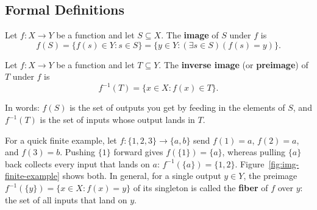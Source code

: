 \subsection{Formal Definitions}

\begin{definition}
Let $f: X \to Y$ be a function and let $S \subseteq X$. The \textbf{image} of $S$ under $f$ is
\[
f(S) = \{f(s) \in Y : s \in S\} = \{y \in Y : (\exists s \in S)(f(s) = y)\}.
\]
\end{definition}

\begin{definition}
Let $f: X \to Y$ be a function and let $T \subseteq Y$. The \textbf{inverse image} (or \textbf{preimage}) of $T$ under $f$ is
\[
f^{-1}(T) = \{x \in X : f(x) \in T\}.
\]
\end{definition}

In words: $f(S)$ is the set of outputs you get by feeding in the elements of $S$, and $f^{-1}(T)$ is the set of inputs whose output lands in $T$.

For a quick finite example, let $f: \{1, 2, 3\} \to \{a, b\}$ send $f(1) = a$, $f(2) = a$, and $f(3) = b$. Pushing $\{1\}$ forward gives $f(\{1\}) = \{a\}$, whereas pulling $\{a\}$ back collects every input that lands on $a$: $f^{-1}(\{a\}) = \{1, 2\}$. Figure~\ref{fig:img-finite-example} shows both. In general, for a single output $y \in Y$, the preimage $f^{-1}(\{y\}) = \{x \in X : f(x) = y\}$ of its singleton is called the \textbf{fiber} of $f$ over $y$: the set of all inputs that land on $y$.


